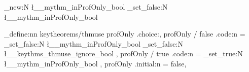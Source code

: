 		\bool_new:N \l__mythm_inProfOnly_bool
		\bool_set_false:N \l__mythm_inProfOnly_bool

		\keys_define:nn { keytheorems/thmuse }
		{
			profOnly  .choice:,
			profOnly / false .code:n = {
				\bool_set_false:N \l__mythm_inProfOnly_bool
				\bool_set_false:N \l__keythms_thmuse_ignore_bool
			},
			profOnly / true .code:n = {
				\bool_set_true:N \l__mythm_inProfOnly_bool
			},
			profOnly  .initial:n = false,
		}
	\ExplSyntaxOff



